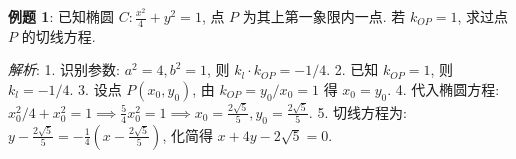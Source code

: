 \begin{examplebox}
\textbf{例题 1}: 已知椭圆 $C: \frac{x^2}{4} + y^2 = 1$, 点 $P$ 为其上第一象限内一点. 若 $k_{OP} = 1$, 求过点 $P$ 的切线方程.

\textit{解析}: 
1. 识别参数: $a^2=4, b^2=1$, 则 $k_l \cdot k_{OP} = -1/4$.
2. 已知 $k_{OP} = 1$, 则 $k_l = -1/4$.
3. 设点 $P(x_0, y_0)$, 由 $k_{OP} = y_0/x_0 = 1$ 得 $x_0 = y_0$.
4. 代入椭圆方程: $x_0^2/4 + x_0^2 = 1 \implies \frac{5}{4}x_0^2 = 1 \implies x_0 = \frac{2\sqrt{5}}{5}, y_0 = \frac{2\sqrt{5}}{5}$.
5. 切线方程为: $y - \frac{2\sqrt{5}}{5} = -\frac{1}{4}(x - \frac{2\sqrt{5}}{5})$, 化简得 $x + 4y - 2\sqrt{5} = 0$.
\end{examplebox}